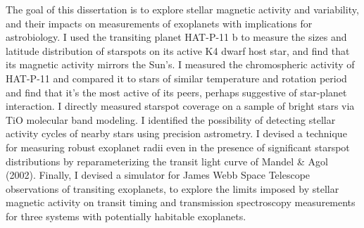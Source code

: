 \documentclass[12pt, twoside]{uwthesis}
\begin{document}
{The goal of this dissertation is to explore stellar magnetic activity and variability, and their impacts on measurements of exoplanets with implications for astrobiology. I used the transiting planet HAT-P-11 b to measure the sizes and latitude distribution of starspots on its active K4 dwarf host star, and find that its magnetic activity mirrors the Sun's. I measured the chromospheric activity of HAT-P-11 and compared it to stars of similar temperature and rotation period and find that it's the most active of its peers, perhaps suggestive of star-planet interaction. I directly measured starspot coverage on a sample of bright stars via TiO molecular band modeling. I identified the possibility of detecting stellar activity cycles of nearby stars using precision astrometry. I devised a technique for measuring robust exoplanet radii even in the presence of significant starspot distributions by reparameterizing the transit light curve of Mandel \& Agol (2002). Finally, I devised a simulator for James Webb Space Telescope observations of transiting exoplanets, to explore the limits imposed by stellar magnetic activity on transit timing and transmission spectroscopy measurements for three systems with potentially habitable exoplanets. 
}
 
%
%
\tableofcontents
 

%
 
\end{document}
